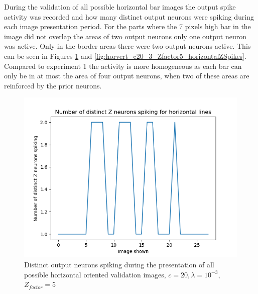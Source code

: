 During the validation of all possible horizontal bar images the output spike activity was recorded and how many distinct output neurons were spiking during each image presentation period. For the parts where the 7 pixels high bar in the image did not overlap the areas of two output neurons only one output neuron was active. Only in the border areas there were two output neurons active. This can be seen in Figures \ref{fig:horvert_c20_3_Zfactor5_horizontalDistinctZ} and \ref{fig:horvert_c20_3_Zfactor5_horizontalZSpikes}. Compared to experiment 1 the activity is more homogeneous as each bar can only be in at most the area of four output neurons, when two of these areas are reinforced by the prior neurons.

\begin{figure}
  \includegraphics[width=\linewidth]{figures/horvert/horvert_c20_3_Zfactor5_horizontalDistinctZ.png}
  \caption{Distinct output neurons spiking during the presentation of all possible horizontal oriented validation images, $c = 20, \lambda = 10^{-3}$, $Z_{factor} = 5$}
  \label{fig:horvert_c20_3_Zfactor5_horizontalDistinctZ}
\end{figure}
